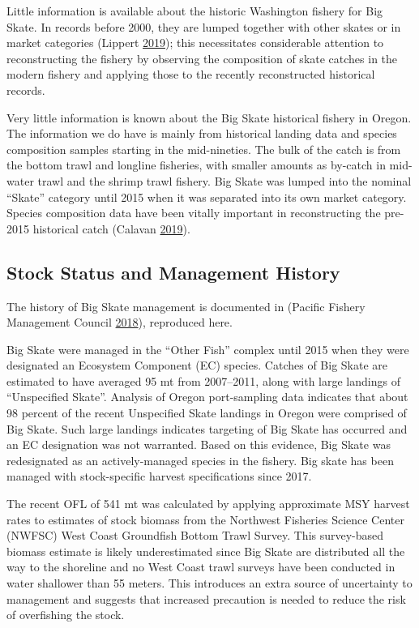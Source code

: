 \documentclass[12pt,]{article}
\begin{document}
Little information is available about the historic Washington fishery
for Big Skate. In records before 2000, they are lumped together with
other skates or in market categories (Lippert
\protect\hyperlink{ref-GregLippert}{2019}); this necessitates
considerable attention to reconstructing the fishery by observing the
composition of skate catches in the modern fishery and applying those to
the recently reconstructed historical records.

Very little information is known about the Big Skate historical fishery
in Oregon. The information we do have is mainly from historical landing
data and species composition samples starting in the mid-nineties. The
bulk of the catch is from the bottom trawl and longline fisheries, with
smaller amounts as by-catch in mid-water trawl and the shrimp trawl
fishery. Big Skate was lumped into the nominal ``Skate'' category until
2015 when it was separated into its own market category. Species
composition data have been vitally important in reconstructing the
pre-2015 historical catch (Calavan
\protect\hyperlink{ref-TedCalavan}{2019}).

\hypertarget{stock-status-and-management-history}{%
\subsection{Stock Status and Management
History}\label{stock-status-and-management-history}}

The history of Big Skate management is documented in (Pacific Fishery
Management Council \protect\hyperlink{ref-PFMC2018}{2018}), reproduced
here.

Big Skate were managed in the ``Other Fish'' complex until 2015 when
they were designated an Ecosystem Component (EC) species. Catches of Big
Skate are estimated to have averaged 95 mt from 2007--2011, along with
large landings of ``Unspecified Skate''. Analysis of Oregon
port-sampling data indicates that about 98 percent of the recent
Unspecified Skate landings in Oregon were comprised of Big Skate. Such
large landings indicates targeting of Big Skate has occurred and an EC
designation was not warranted. Based on this evidence, Big Skate was
redesignated as an actively-managed species in the fishery. Big skate
has been managed with stock-specific harvest specifications since 2017.

The recent OFL of 541 mt was calculated by applying approximate MSY
harvest rates to estimates of stock biomass from the Northwest Fisheries
Science Center (NWFSC) West Coast Groundfish Bottom Trawl Survey. This
survey-based biomass estimate is likely underestimated since Big Skate
are distributed all the way to the shoreline and no West Coast trawl
surveys have been conducted in water shallower than 55 meters. This
introduces an extra source of uncertainty to management and suggests
that increased precaution is needed to reduce the risk of overfishing
the stock.
\end{document}

